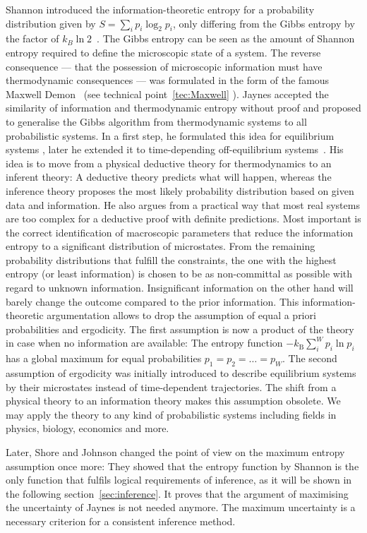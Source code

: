 Shannon introduced the information-theoretic entropy for a probability distribution given by $S = \sum_i p_i \log_2 p_i$, only differing from the Gibbs entropy by the factor of $k_B \ln 2$~\cite{shannon1948mathematical}. 
The Gibbs entropy can be seen as the amount of Shannon entropy required to define the microscopic state of a system. The reverse consequence --- that the possession of microscopic information must have thermodynamic consequences --- was formulated in the form of the famous Maxwell Demon~\cite{bennett1982thermodynamics} (see technical point~\ref{tec:Maxwell} ). Jaynes accepted the similarity of information and thermodynamic entropy without proof and proposed to generalise the Gibbs algorithm from thermodynamic systems to all probabilistic systems. In a first step, he formulated this idea for equilibrium systems \cite{jaynes1957information}, later he extended it to time-depending off-equilibrium  systems~\cite{jaynes1985macroscopic}. His idea is to move from a physical deductive theory for thermodynamics to an inferent theory: A deductive theory predicts what will happen, whereas the inference theory proposes the most likely probability distribution based on given data and information. 
He also argues from a practical way that most real systems are 
too complex for a deductive proof with definite predictions. Most important 
is the correct identification of macroscopic parameters that reduce the information entropy to a significant distribution of microstates. From the remaining probability distributions that fulfill the constraints, the one with the highest entropy (or least information) is chosen to be as non-committal as possible with regard to unknown information. Insignificant information 
on the other hand will barely change the outcome compared to the prior information.
This information-theoretic argumentation allows to drop the assumption of equal a priori probabilities and ergodicity. The first assumption is now a product of the theory in case when no information are available: The entropy function $-k_{\mathrm{B}} \sum^W_i p_i \ln p_i$ has a global maximum for equal probabilities $p_1 = p_2 =\dots=p_W$.  The second assumption of ergodicity was initially introduced to describe equilibrium systems by their microstates instead of time-dependent trajectories.  The shift from a physical theory to an information theory makes this assumption obsolete. We may apply the theory to any kind of probabilistic systems including fields in physics, biology, economics and more. 

Later, Shore and Johnson changed the point of view on the maximum entropy assumption once more: They showed that the entropy function by Shannon is the only function that fulfils logical requirements of inference, 
as it will be shown in the following section~\ref{sec:inference}. It proves that the argument of maximising the uncertainty of Jaynes is not needed anymore. The maximum uncertainty is a necessary criterion for a consistent inference method. 

